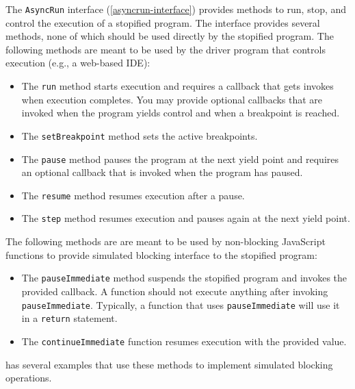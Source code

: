 \documentclass[10pt]{book}
\begin{document}
The \lstinline|AsyncRun| interface (\cref{asyncrun-interface}) provides methods
to run, stop, and control the execution of a stopified program. The
interface provides several methods, none of which should be used
directly by the stopified program. The following methods are meant to be
used by the driver program that controls execution (e.g., a web-based IDE):

\begin{itemize}

  \item The \lstinline|run| method starts execution and requires a callback that
  gets invokes when execution completes. You may provide optional callbacks
  that are invoked when the program yields control and when a breakpoint is reached.

  \item The \lstinline|setBreakpoint| method sets the active breakpoints.

  \item The \lstinline|pause| method pauses the program at the next yield point
  and requires an optional callback that is invoked when the program has paused.

  \item The \lstinline|resume| method resumes execution after a pause.

  \item The \lstinline|step| method resumes execution and pauses again at the
  next yield point.

\end{itemize}

The following methods are are meant to be used by non-blocking
JavaScript functions to provide simulated blocking interface to the stopified
program:
\begin{itemize}

  \item The \lstinline|pauseImmediate| method suspends the stopified program
  and invokes the provided callback. A function should not execute anything
  after invoking \lstinline|pauseImmediate|. Typically, a function that
  uses \lstinline|pauseImmediate| will use it in a \lstinline|return| statement.

  \item The \lstinline|continueImmediate| function resumes execution with
  the provided value.

\end{itemize}

 has several examples that use these methods
to implement simulated blocking operations.
\end{document}
